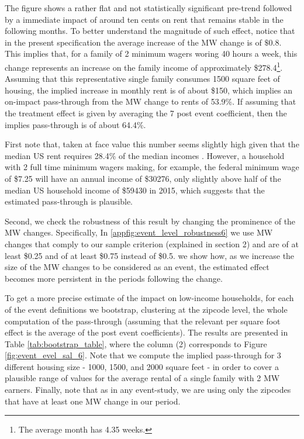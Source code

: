 The figure shows a rather flat and not statistically significant pre-trend followed by a immediate impact of around ten cents on rent that remains stable in the following months. 
To better understand the magnitude of such effect, notice that in the present specification the average increase of the MW change is of $\$0.8$. This implies that, for a family of 2 minimum wagers woring 40 hours a week, this change represents an increase on the family income of approximately \$278.4\footnote{The average month has 4.35 weeks.}. Assuming that this representative single family consumes 1500 square feet of housing, the implied increase in monthly rent is of about \$150, which implies an on-impact pass-through from the MW change to rents of 53.9\%. If assuming that the treatment effect is given by averaging the 7 post event coefficient, then the implies pass-through is of about 64.4\%.

First note that, taken at face value this number seems slightly high given that the median US rent requires 28.4\% of the median incomes \parencite{bi}. However, a household with 2 full time minimum wagers making, for example, the federal minimum wage of \$7.25 will have an annual income of \$30276, only slightly above half of the median US household income of \$59430 in 2015, which suggests that the estimated pass-through is plausible. 

Second, we check the robustness of this result by changing the prominence of the MW changes. Specifically, In \autoref{appfig:event_level_robustness6} we use MW changes that comply to our sample criterion (explained in section 2) and are of at least \$0.25 and of at least \$0.75 instead of \$0.5. we show how, as we increase the size of the MW changes to be considered as an event, the estimated effect becomes more persistent in the periods following the change. 

To get a more precise estimate of the impact on low-income households, for each of the event definitions we bootstrap, clustering at the zipcode level, the whole computation of the pass-through (assuming that the relevant per square foot effect is the average of the post event coefficients). The results are presented in Table \ref{tab:bootstrap_table}, where the column (2) corresponds to Figure \ref{fig:event_evel_sal_6}. Note that we compute the implied pass-through for 3 different housing size - 1000, 1500, and 2000 square feet - in order to cover a plausible range of values for the average rental of a single family with 2 MW earners. Finally, note that as in any event-study, we are using only the zipcodes that have at least one MW change in our period. 

